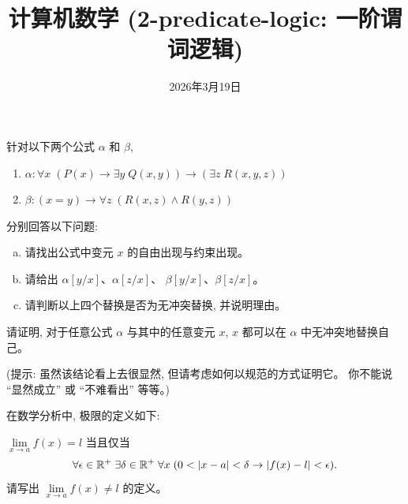 \documentclass[a4paper, justified]{tufte-handout}
\title{计算机数学 (2-predicate-logic: 一阶谓词逻辑)}
\date{2026年3月19日}
\begin{document}
\maketitle
\noplagiarism %
\begin{abstract}
\end{abstract}
\beginrequired

\begin{problem}
  针对以下两个公式 $\alpha$ 和 $\beta$,
  \begin{enumerate}[(1)]
    \item $\alpha: \forall x\; (P(x) \to \exists y\; Q(x, y))
      \to (\exists z\; R(x, y, z))$
    \item $\beta: (x = y) \to \forall z\; (R(x, z) \land R(y, z))$
  \end{enumerate}
  分别回答以下问题:
  \begin{enumerate}[(a)]
    \item 请找出公式中变元 $x$ 的自由出现与约束出现。
    \item 请给出 $\alpha[y/x]$、$\alpha[z/x]$、
      $\beta[y/x]$、$\beta[z/x]$。
    \item 请判断以上四个替换是否为无冲突替换, 并说明理由。
  \end{enumerate}
\end{problem}

\begin{solution}
\end{solution}

\begin{problem}[一阶谓词逻辑: 替换]
  请证明, 对于任意公式 $\alpha$ 与其中的任意变元 $x$,
  $x$ 都可以在 $\alpha$ 中无冲突地替换自己。

  \noindent (提示: 虽然该结论看上去很显然, 但请考虑如何以规范的方式证明它。
  你不能说 ``显然成立'' 或 ``不难看出'' 等等。)
\end{problem}

\begin{solution}
\end{solution}

\begin{problem}
  在数学分析中, 极限的定义如下:

  $\lim\limits_{x \to a} f(x) = l$ 当且仅当
  \[
    \forall \epsilon \in \mathbb{R}^{+}\; \exists \delta \in \mathbb{R}^{+}\;
      \forall x\; (0 < |x - a| < \delta \to |f(x) - l| < \epsilon).
  \]
  请写出 $\lim\limits_{x \to a} f(x) \neq l$ 的定义。
\end{problem}
\end{document}
